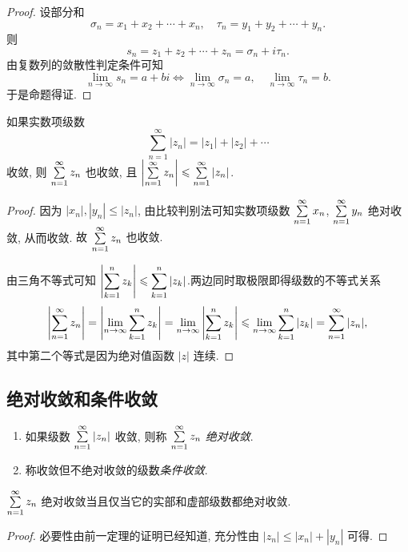\documentclass[nocolor,theme=doremi,lang=cn,11pt,chinese,twoside,openright,usesamecnt]{elegantbook}
\begin{document}
\begin{proof}
	设部分和
	\[\sigma_n=x_1+x_2+\cdots+x_n,\quad
		\tau_n=y_1+y_2+\cdots+y_n.\]
	{则
		\[s_n=z_1+z_2+\cdots+z_n=\sigma_n+i\tau_n.\]由复数列的敛散性判定条件可知
		\[\lim_{n\to\infty}s_n=a+bi\iff	\lim_{n\to\infty}\sigma_n=a,\quad \lim_{n\to\infty}\tau_n=b.\]于是命题得证.\qedhere}
\end{proof}

\begin{theorem}
	如果实数项级数
	\[\sum_{n=1}^\infty|z_n|=|z_1|+|z_2|+\cdots\]
	收敛, 则 $\sum\limits_{n=1}^\infty z_n$ 也收敛, 且 $\left|\sum\limits_{n=1}^\infty z_n\right|\leqslant\sum\limits_{n=1}^\infty |z_n|$.
\end{theorem}

\begin{proof}
	因为 $|x_n|,|y_n|\le|z_n|$, 由比较判别法可知实数项级数 $\sum\limits_{n=1}^\infty x_n$, $\sum\limits_{n=1}^\infty y_n$ 绝对收敛, 从而收敛.
	{故 $\sum\limits_{n=1}^\infty z_n$ 也收敛.}

	{由三角不等式可知
		$\displaystyle\left|\sum_{k=1}^n z_k\right|\leqslant \sum_{k=1}^n|z_k|$.两边同时取极限即得级数的不等式关系
		\[\left|\sum_{n=1}^\infty z_n\right|=\left|\lim_{n\to\infty}\sum_{k=1}^n z_k\right|=
		\lim_{n\to\infty}\left|\sum_{k=1}^n z_k\right|\leqslant\lim_{n\to\infty}\sum_{k=1}^n|z_k|=\sum_{n=1}^\infty |z_n|,\]其中第二个等式是因为绝对值函数 $|z|$ 连续.\qedhere}
\end{proof}

\subsection{绝对收敛和条件收敛}

\begin{definition}
		\begin{enumerate}
		\item 如果级数 $\sum\limits_{n=1}^\infty |z_n|$ 收敛, 则称 $\sum\limits_{n=1}^\infty z_n$ \emph{绝对收敛}.
		\item 称收敛但不绝对收敛的级数\emph{条件收敛}.
	\end{enumerate}
\end{definition}

\begin{theorem}
	$\sum\limits_{n=1}^\infty z_n$ 绝对收敛当且仅当它的实部和虚部级数都绝对收敛.
\end{theorem}

\begin{proof}
	必要性由前一定理的证明已经知道,
	{充分性由 $|z_n|\le|x_n|+|y_n|$ 可得.\qedhere}
\end{proof}
\end{document}
